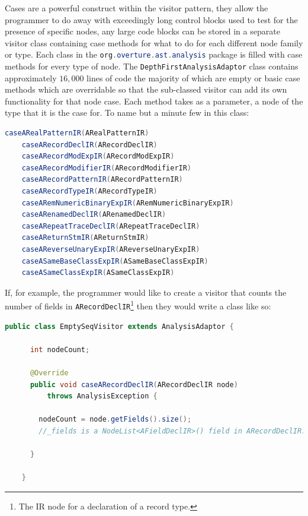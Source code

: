 	Cases are a powerful construct within the visitor pattern, they allow the programmer to do away with exceedingly long control blocks used to test for the presence of specific nodes, any large code blocks can be stored in a separate visitor class containing case methods for what to do for each different node family or type. Each class in the \lstinline[language=Java]{org.overture.ast.analysis} package is filled with case methods for every type of node. The \lstinline[language=Java]{DepthFirstAnalysisAdaptor} class contains approximately $16,000$ lines of code the majority of which are empty or basic case methods which are overridable so that the sub-classed visitor can add its own functionality for that node case. Each method takes as a parameter, a node of the type that it is the case for. To name but a minute few in this class:
	\begin{lstlisting}[language=Java]
	caseARealPatternIR(ARealPatternIR)
	caseARecordDeclIR(ARecordDeclIR)
	caseARecordModExpIR(ARecordModExpIR)
	caseARecordModifierIR(ARecordModifierIR)
	caseARecordPatternIR(ARecordPatternIR)
	caseARecordTypeIR(ARecordTypeIR)
	caseARemNumericBinaryExpIR(ARemNumericBinaryExpIR)
	caseARenamedDeclIR(ARenamedDeclIR)
	caseARepeatTraceDeclIR(ARepeatTraceDeclIR)
	caseAReturnStmIR(AReturnStmIR)
	caseAReverseUnaryExpIR(AReverseUnaryExpIR)
	caseASameBaseClassExpIR(ASameBaseClassExpIR)
	caseASameClassExpIR(ASameClassExpIR)
	\end{lstlisting}
	If, for example, the programmer would like to create a visitor that counts the number of fields in \lstinline[language=Java]{ARecordDeclIR}\footnote{The IR node for a declaration of a record type.} then they would write a class like so:
	\begin{lstlisting}[language=Java]
	public class EmptySeqVisitor extends AnalysisAdaptor {

	  int nodeCount;
	  
	  @Override
	  public void caseARecordDeclIR(ARecordDeclIR node)
	      throws AnalysisException {
	  
	    nodeCount = node.getFields().size();
	    //_fields is a NodeList<AFieldDeclIR>() field in ARecordDeclIR. NodeList is a VDM class in the AST package implementing list functionality.
	    
	  }
	  
	}
	\end{lstlisting}

